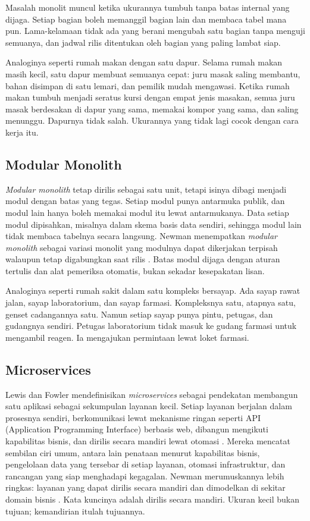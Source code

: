 Masalah monolit muncul ketika ukurannya tumbuh tanpa batas internal yang dijaga. Setiap bagian boleh
memanggil bagian lain dan membaca tabel mana pun. Lama-kelamaan tidak ada yang berani mengubah satu
bagian tanpa menguji semuanya, dan jadwal rilis ditentukan oleh bagian yang paling lambat siap.

Analoginya seperti rumah makan dengan satu dapur. Selama rumah makan masih kecil, satu dapur membuat
semuanya cepat: juru masak saling membantu, bahan disimpan di satu lemari, dan pemilik mudah
mengawasi. Ketika rumah makan tumbuh menjadi seratus kursi dengan empat jenis masakan, semua juru
masak berdesakan di dapur yang sama, memakai kompor yang sama, dan saling menunggu. Dapurnya tidak
salah. Ukurannya yang tidak lagi cocok dengan cara kerja itu.

\subsection{Modular Monolith}

\textit{Modular monolith} tetap dirilis sebagai satu unit, tetapi isinya dibagi menjadi modul
dengan batas yang tegas. Setiap modul punya antarmuka publik, dan modul lain hanya boleh memakai
modul itu lewat antarmukanya. Data setiap modul dipisahkan, misalnya dalam skema basis data sendiri,
sehingga modul lain tidak membaca tabelnya secara langsung. Newman menempatkan \textit{modular
monolith} sebagai variasi monolit yang modulnya dapat dikerjakan terpisah walaupun tetap digabungkan
saat rilis \cite{newman2021}. Batas modul dijaga dengan aturan tertulis dan alat pemeriksa
otomatis, bukan sekadar kesepakatan lisan.

Analoginya seperti rumah sakit dalam satu kompleks bersayap. Ada sayap rawat jalan, sayap
laboratorium, dan sayap farmasi. Kompleksnya satu, atapnya satu, genset cadangannya satu. Namun
setiap sayap punya pintu, petugas, dan gudangnya sendiri. Petugas laboratorium tidak masuk ke gudang
farmasi untuk mengambil reagen. Ia mengajukan permintaan lewat loket farmasi.

\subsection{Microservices}

Lewis dan Fowler mendefinisikan \textit{microservices} sebagai pendekatan membangun satu aplikasi
sebagai sekumpulan layanan kecil. Setiap layanan berjalan dalam prosesnya sendiri, berkomunikasi
lewat mekanisme ringan seperti API (Application Programming Interface) berbasis web, dibangun
mengikuti kapabilitas bisnis, dan dirilis secara mandiri lewat otomasi \cite{lewis-fowler2014}.
Mereka mencatat sembilan ciri umum, antara lain penataan menurut kapabilitas bisnis, pengelolaan
data yang tersebar di setiap layanan, otomasi infrastruktur, dan rancangan yang siap menghadapi
kegagalan. Newman merumuskannya lebih ringkas: layanan yang dapat dirilis secara mandiri dan
dimodelkan di sekitar domain bisnis \cite{newman2021}. Kata kuncinya adalah dirilis secara
mandiri. Ukuran kecil bukan tujuan; kemandirian itulah tujuannya.

